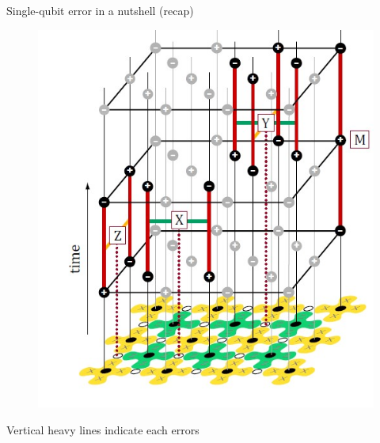 \documentclass{beamer}
\begin{document}
    \begin{frame}{Single-qubit error in a nutshell (recap)}
        \begin{figure}[h]
            \centering
            \includegraphics[height=0.7\textheight]{./Images/surf-code-single-error.jpg}
        \end{figure}
        Vertical heavy lines indicate each errors
    \end{frame}
    
\end{document}
